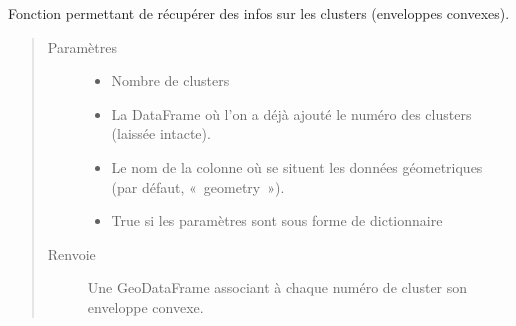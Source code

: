 \documentclass[letterpaper,10pt,french]{sphinxmanual}
\begin{document}
\begin{fulllineitems}
\label{\detokenize{index:src.clusterizer.utils.clusterizer_utils.get_infos_clusters_enveloppes_convexes}}
\sphinxAtStartPar
Fonction permettant de récupérer des infos sur les clusters (enveloppes convexes).
\begin{quote}\begin{description}
\item[{Paramètres}] \leavevmode\begin{itemize}
\item {} 
\sphinxAtStartPar
{} \textendash{} Nombre de clusters

\item {} 
\sphinxAtStartPar
{} \textendash{} La DataFrame où l’on a déjà ajouté le numéro des clusters (laissée intacte).

\item {} 
\sphinxAtStartPar
{} \textendash{} Le nom de la colonne où se situent les données géometriques (par défaut, « geometry »).

\item {} 
\sphinxAtStartPar
{} \textendash{} True si les paramètres sont sous forme de dictionnaire

\end{itemize}

\item[{Renvoie}] \leavevmode
\sphinxAtStartPar
Une GeoDataFrame associant à chaque numéro de cluster son enveloppe convexe.

\end{description}\end{quote}

\end{fulllineitems}
\end{document}
